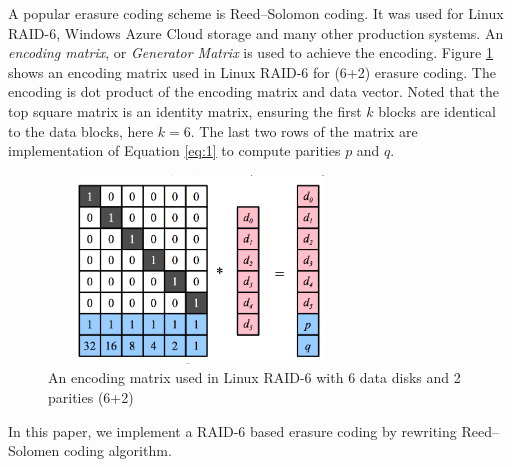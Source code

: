 
A popular erasure coding scheme is Reed--Solomon coding. It was used for Linux RAID-6, Windows Azure Cloud storage and many other production systems. An \textit{encoding matrix}, or \textit{Generator Matrix} is used to achieve the encoding. Figure \ref{fig:encoding_matrix} shows an encoding matrix used in Linux RAID-6 for (6+2) erasure coding. The encoding is dot product of the encoding matrix and data vector. Noted that the top square matrix is an identity matrix, ensuring the first $k$ blocks are identical to the data blocks, here $k=6$. The last two rows of the matrix are implementation of Equation \ref{eq:1} to compute parities $p$ and $q$.


\begin{figure}[t]
	\includegraphics[width=8cm,height=5cm,angle=0]{encoding_matrix.png}
	\caption{An encoding matrix used in Linux RAID-6 with 6 data disks and 2 parities (6+2) \cite{plank2013tutorial} }
	\label{fig:encoding_matrix}
\end{figure}

In this paper, we implement a RAID-6 based erasure coding by rewriting Reed--Solomen coding algorithm.
